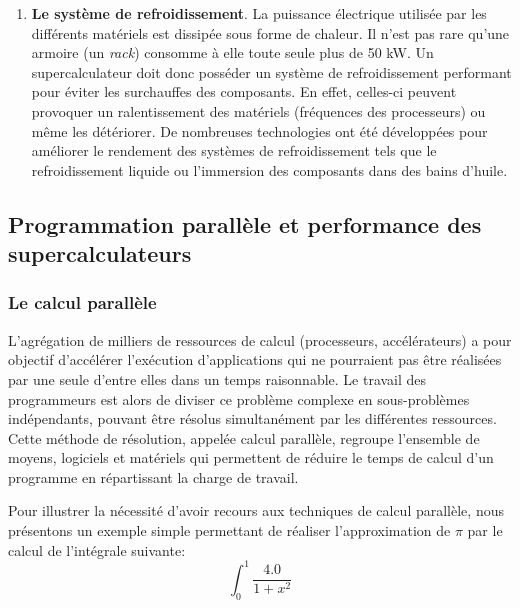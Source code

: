\begin{enumerate}
    
            \item \textbf{Le système de refroidissement}. La puissance électrique utilisée par les différents matériels est dissipée sous forme de chaleur. Il n'est pas rare qu'une armoire (un \textit{rack}) consomme à elle toute seule plus de 50 kW. Un supercalculateur doit donc posséder un système de refroidissement performant pour éviter les surchauffes des composants. En effet, celles-ci peuvent provoquer un ralentissement des matériels (fréquences des processeurs) ou même les détériorer. De nombreuses technologies ont été développées pour améliorer le rendement des systèmes de refroidissement tels que le refroidissement liquide ou l'immersion des composants dans des bains d'huile.
        \end{enumerate}


\subsection{Programmation parallèle et performance des supercalculateurs}      
\label{sec:prog_parallele}

    \subsubsection{Le calcul parallèle}\label{sec:exemple_pi}
        
        L'agrégation de milliers de ressources de calcul (processeurs, accélérateurs) a pour objectif d'accélérer l'exécution d'applications qui ne pourraient pas être réalisées par une seule d'entre elles dans un temps raisonnable. Le travail des programmeurs est alors de diviser ce problème complexe en sous-problèmes indépendants, pouvant être résolus simultanément par les différentes ressources. Cette méthode de résolution, appelée calcul parallèle, regroupe l'ensemble de moyens, logiciels et matériels qui permettent de réduire le temps de calcul d'un programme en répartissant la charge de travail.
       
        Pour illustrer la nécessité d'avoir recours aux techniques de calcul parallèle, nous présentons un exemple simple permettant de réaliser l'approximation de $\pi$ par le calcul de l'intégrale suivante:
        \begin{equation}
        \label{eq_pi}
        \int_{0}^{1} \frac{4.0}{1 + x^{2}}
        \end{equation}
        

